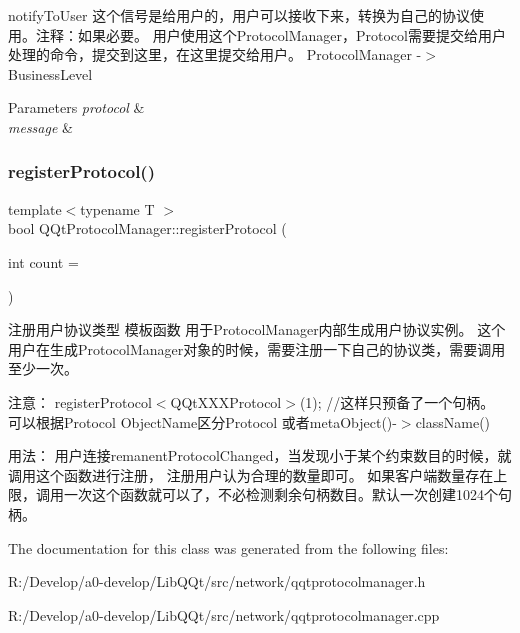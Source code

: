 notify\+To\+User 这个信号是给用户的，用户可以接收下来，转换为自己的协议使用。注释：如果必要。 用户使用这个\+Protocol\+Manager，\+Protocol需要提交给用户处理的命令，提交到这里，在这里提交给用户。 Protocol\+Manager -\/$>$ Business\+Level 


\begin{DoxyParams}{Parameters}
{\em protocol} & \\
\hline
{\em message} & \\
\hline
\end{DoxyParams}
\mbox{\label{class_q_qt_protocol_manager_a82e23b25b4991b6b04969bab7645cb1a}} 
\subsubsection{\texorpdfstring{register\+Protocol()}{registerProtocol()}}
{\footnotesize\ttfamily template$<$typename T $>$ \\
bool Q\+Qt\+Protocol\+Manager\+::register\+Protocol (\begin{DoxyParamCaption}\item[{int}]{count = {} }\end{DoxyParamCaption})\hspace{0.3cm}{\ttfamily [inline]}}

注册用户协议类型 模板函数 用于\+Protocol\+Manager内部生成用户协议实例。 这个用户在生成\+Protocol\+Manager对象的时候，需要注册一下自己的协议类，需要调用至少一次。

注意： register\+Protocol$<$\+Q\+Qt\+X\+X\+X\+Protocol$>$(1); //这样只预备了一个句柄。 可以根据\+Protocol Object\+Name区分\+Protocol 或者meta\+Object()-\/$>$class\+Name()

用法： 用户连接remanent\+Protocol\+Changed，当发现小于某个约束数目的时候，就调用这个函数进行注册， 注册用户认为合理的数量即可。 如果客户端数量存在上限，调用一次这个函数就可以了，不必检测剩余句柄数目。默认一次创建1024个句柄。 

The documentation for this class was generated from the following files\+:\begin{DoxyCompactItemize}
\item 
R\+:/\+Develop/a0-\/develop/\+Lib\+Q\+Qt/src/network/qqtprotocolmanager.\+h\item 
R\+:/\+Develop/a0-\/develop/\+Lib\+Q\+Qt/src/network/qqtprotocolmanager.\+cpp\end{DoxyCompactItemize}

